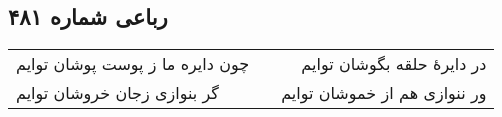 \begin{center}
\section*{رباعی شماره ۴۸۱}
\label{sec:sh481}
\begin{longtable}{l p{0.5cm} r}
چون دایره ما ز پوست پوشان توایم
&&
در دایرهٔ حلقه بگوشان توایم
\\
گر بنوازی زجان خروشان توایم
&&
ور ننوازی هم از خموشان توایم
\\
\end{longtable}
\end{center}
